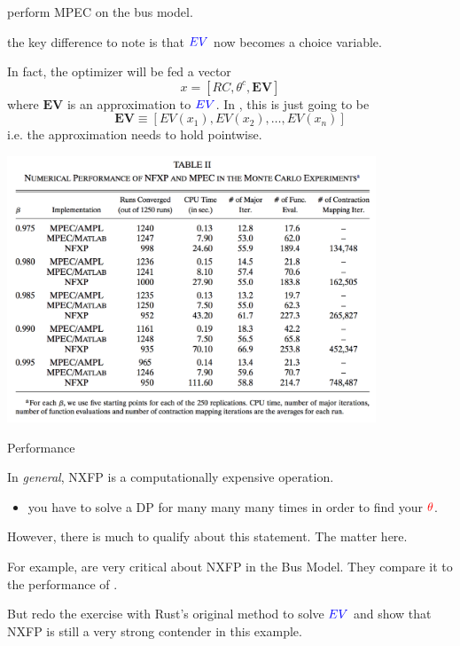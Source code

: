 \documentclass[english]{beamer}
\begin{document}
\begin{frame}{\cite{juddsu}}

\begin{midi}
\item \cite{juddsu} perform MPEC on the bus model.
\item the key difference to note is that ${\color{blue}{EV}}$ now becomes a choice variable.
\item In fact, the optimizer will be fed a vector
\begin{equation*}
x = [RC,\theta^c,\mathbf{EV}]
\end{equation*}
where $\mathbf{EV}$ is an approximation to ${\color{blue}{EV}}$. In \cite{juddsu}, this is just going to be 
\begin{equation*}
\mathbf{EV} \equiv [EV(x_1),EV(x_2),\dots,EV(x_n)]
\end{equation*}
i.e. the approximation needs to hold pointwise.
\end{midi}
\end{frame}

\begin{frame}{\cite{juddsu}}
\includegraphics[width=11cm]{su-2.png}

\end{frame}

\begin{frame}{Performance}
\begin{midi}
\item In \emph{general}, NXFP is a computationally expensive operation.
\begin{itemize}
\item you have to solve a DP for many many many times in order to find your ${\color{red}{\theta}}$.
\end{itemize}
\item However, there is much to qualify about this statement. The  matter here.
\item For example, \cite{juddsu} are very critical about NXFP in the Bus Model. They compare it to the performance of .
\item But \citet{iskhakov2016comment} redo the exercise with Rust's original method to solve ${\color{blue}{EV}}$ and show that NXFP is still a very strong contender in this example.
\end{midi}
\end{frame}
\end{document}
